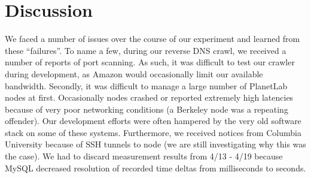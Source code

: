 
\section{Discussion}
\label{sec:discussion}
We faced a number of issues over the course of our experiment and learned from these ``failures''. To name a few, during our reverse DNS crawl, we received a number of reports of port scanning. As such, it was difficult to test our crawler during development, as Amazon would occasionally limit our available bandwidth. Secondly, it was difficult to manage a large number of PlanetLab nodes at first. Occasionally nodes crashed or reported extremely high latencies because of very poor networking conditions (a Berkeley node was a repeating offender). Our development efforts were often hampered by the very old software stack on some of these systems. Furthermore, we received notices from Columbia University because of SSH tunnels to node (we are still investigating why this was the case). We had to discard measurement results from 4/13 - 4/19 because MySQL decreased resolution of recorded time deltas from milliseconds to seconds.

